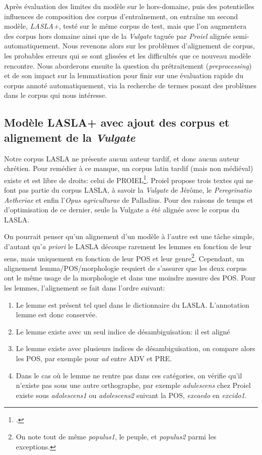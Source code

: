 Après évaluation des limites du modèle sur le hors-domaine, puis des potentielles influences de composition des corpus d'entraînement, on entraîne un second modèle, \textit{LASLA+}, testé sur le même corpus de test, mais que l'on augmentera des corpus hors domaine ainsi que de la \textit{Vulgate} taguée par \textit{Proiel} alignée semi-automatiquement. Nous revenons alors sur les problèmes d'alignement de corpus, les probables erreurs qui se sont glissées et les difficultés que ce nouveau modèle rencontre. Nous aborderons ensuite la question du prétraitement (\textit{preprocessing}) et de son impact sur la lemmatisation pour finir sur une évaluation rapide du corpus annoté automatiquement, via la recherche de termes posant des problèmes dans le corpus qui nous intéresse.

\subsection{Modèle LASLA+ avec ajout des corpus et alignement de la \textit{Vulgate}}

Notre corpus LASLA ne présente aucun auteur tardif, et donc aucun auteur chrétien. Pour remédier à ce manque, un corpus latin tardif (mais non médiéval) existe et est libre de droits: celui de PROIEL\footcite{haug_creating_2008}. Proiel propose trois textes qui ne font pas partie du corpus LASLA, à savoir la \textit{Vulgate} de Jérôme, le \textit{Peregrinatio Aetheriae} et enfin l'\textit{Opus agriculturae} de Palladius. Pour des raisons de temps et d'optimisation de ce dernier, seule la Vulgate a été alignée avec le corpus du LASLA.

On pourrait penser qu'un alignement d'un modèle à l'autre est une tâche simple, d'autant qu'\textit{a priori} le LASLA découpe rarement les lemmes en fonction de leur sens, mais uniquement en fonction de leur POS et leur genre\footnote{On note tout de même \textit{populus1}, le peuple, et \textit{populus2} parmi les exceptions.}. Cependant, un alignement lemma/POS/morphologie requiert de s'assurer que les deux corpus ont le même usage de la morphologie et dans une moindre mesure des POS. Pour les lemmes, l'alignement se fait dans l'ordre suivant:
\begin{enumerate}
    \item Le lemme est présent tel quel dans le dictionnaire du LASLA. L'annotation lemme est donc conservée.
    \item Le lemme existe avec un seul indice de désambiguïsation: il est aligné
    \item Le lemme existe avec plusieurs indices de désambiguïsation, on compare alors les POS, par exemple pour \textit{ad} entre ADV et PRE.
    \item Dans le cas où le lemme ne rentre pas dans ces catégories, on vérifie qu'il n'existe pas sous une autre orthographe, par exemple \textit{adulescens} chez Proiel existe sous \textit{adolescens1} ou \textit{adolescens2} suivant la POS, \textit{excaedo} en \textit{excido1}.
\end{enumerate}

